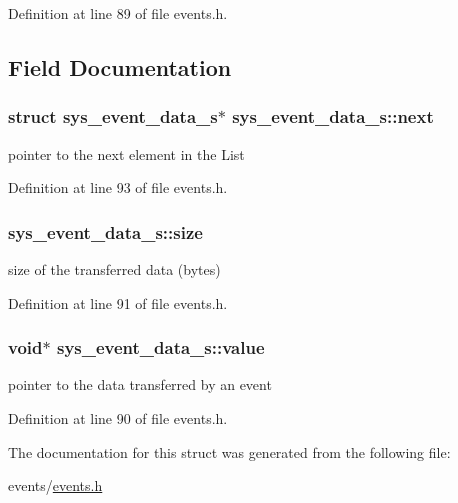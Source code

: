 Definition at line 89 of file events.\+h.



\subsection{Field Documentation}
\hypertarget{structsys__event__data__s_aa6f72c940fd46fc646876fe4271040a8}{}
\subsubsection[{next}]{\setlength{\rightskip}{0pt plus 5cm}struct {\bf sys\+\_\+event\+\_\+data\+\_\+s}$\ast$ sys\+\_\+event\+\_\+data\+\_\+s\+::next}\label{structsys__event__data__s_aa6f72c940fd46fc646876fe4271040a8}
pointer to the next element in the List 

Definition at line 93 of file events.\+h.

\hypertarget{structsys__event__data__s_a61e4846d66a617a9e5ed3602a3be63ef}{}
\subsubsection[{size}]{ sys\+\_\+event\+\_\+data\+\_\+s\+::size}\label{structsys__event__data__s_a61e4846d66a617a9e5ed3602a3be63ef}
size of the transferred data (bytes) 

Definition at line 91 of file events.\+h.

\hypertarget{structsys__event__data__s_a72c5ebbbee4b4509abcfb926d23f294f}{}
\subsubsection[{value}]{\setlength{\rightskip}{0pt plus 5cm}void$\ast$ sys\+\_\+event\+\_\+data\+\_\+s\+::value}\label{structsys__event__data__s_a72c5ebbbee4b4509abcfb926d23f294f}
pointer to the data transferred by an event 

Definition at line 90 of file events.\+h.



The documentation for this struct was generated from the following file\+:\begin{DoxyCompactItemize}
\item 
events/\hyperlink{events_8h}{events.\+h}\end{DoxyCompactItemize}
